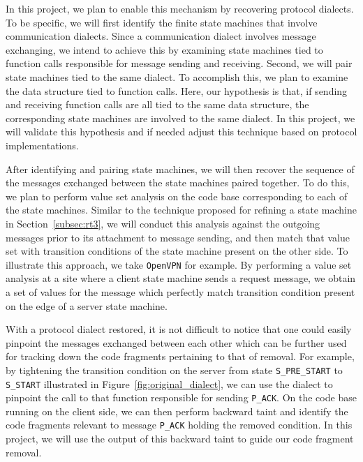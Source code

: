{{In this project, we plan to enable this mechanism by recovering protocol
dialects. To be specific, we will first identify the finite state machines that
involve communication dialects. Since a communication dialect involves message
exchanging, we intend to achieve this by examining state machines tied to
function calls responsible for message sending and receiving. Second, we will
pair state machines tied to the same dialect. To accomplish this, we plan to
examine the data structure tied to function calls. Here, our hypothesis is that,
if sending and receiving function calls are all tied to the same data structure,
the corresponding state machines are involved to the same dialect. In this
project, we will validate this hypothesis and if needed adjust this technique
based on protocol implementations.

After identifying and pairing state machines, we will then recover the sequence
of the messages exchanged between the state machines paired together. To do
this, we plan to  perform value set analysis on the code base corresponding to
each of the state machines. Similar to the technique proposed for refining a
state machine in Section~\ref{subsec:rt3}, we will conduct this analysis against
the outgoing messages prior to its attachment to message sending, and then match
that value set with transition conditions of the state machine present on the
other side. To illustrate this approach, we take \texttt{OpenVPN} for example.
By performing a value set analysis at a site where a client state machine
sends a request message, we obtain a set of values for the message which
perfectly match transition condition 
present on the edge of a server state machine.

With a protocol dialect restored, it is not difficult to notice that one could
easily pinpoint the messages exchanged between each other which can be further
used for tracking down the code fragments pertaining to that of removal. For
example, by tightening the transition condition on the server from state
\texttt{S\_PRE\_START} to \texttt{S\_START} illustrated in
Figure~\ref{fig:original_dialect}, we can use the dialect to pinpoint the call
to that function responsible for sending \texttt{P\_ACK}. On the code base
running on the client side, we can then perform backward taint and identify the
code fragments relevant to message \texttt{P\_ACK} holding the removed
condition. In this project, we will use the output of this backward taint to
guide our code fragment removal.


}}
